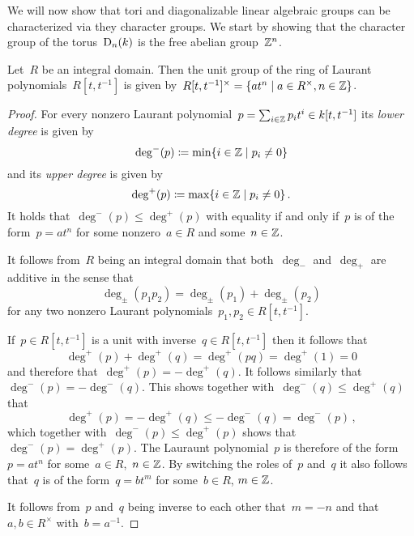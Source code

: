 \begin{fluff}
  We will now show that tori and diagonalizable linear algebraic groups can be characterized via they character groups.
  We start by showing that the character group of the torus~$\operatorname{D}_n(k)$ is the free abelian group~$\mathbb{Z}^n$.
\end{fluff}


\begin{lemma}
  \label{units of laurant polynomials}
  Let~$R$ be an integral domain.
  Then the unit group of the ring of Laurant polynomials~$R[t,t^{-1}]$ is given by~$R[t,t^{-1}]^\times = \{ a t^n \suchthat a \in R^\times, n \in \Integer\}$.
\end{lemma}


\begin{proof}
  For every nonzero Laurant polynomial~$p = \sum_{i \in \mathbb{Z}} p_i t^i \in k[t,t^{-1}]$ its \emph{lower degree} is given by
  \[
              \deg^-(p)
    \defined  \min \{ i \in \Integer \suchthat p_i \neq 0 \}
  \]
  and its \emph{upper degree} is given by
  \[
              \deg^+(p)
    \defined  \max \{ i \in \Integer \suchthat p_i \neq 0 \} \,.
  \]
  It holds that~$\deg^-(p) \leq \deg^+(p)$ with equality if and only if~$p$ is of the form~$p = a t^n$ for some nonzero~$a \in R$ and some~$n \in \mathbb{Z}$.
  
  It follows from~$R$ being an integral domain that both~$\deg_-$ and~$\deg_+$ are additive in the sense that
  \[
    \deg_\pm(p_1 p_2) = \deg_\pm(p_1) + \deg_\pm(p_2)
  \]
  for any two nonzero Laurant polynomials~$p_1, p_2 \in R[t, t^{-1}]$.
  
  If~$p \in R[t, t^{-1}]$ is a unit with inverse~$q \in R[t, t^{-1}]$ then it follows that
  \[
      \deg^+(p) + \deg^+(q)
    = \deg^+(pq)
    = \deg^+(1)
    = 0
  \]
  and therefore that~$\deg^+(p) = -\deg^+(q)$.
  It follows similarly that~$\deg^-(p) = -\deg^-(q)$.
  This shows together with~$\deg^-(q) \leq \deg^+(q)$ that
  \[
          \deg^+(p)
    =     - \deg^+(q)
    \leq  - \deg^-(q)
    =     \deg^-(p) \,,
  \]
  which together with~$\deg^-(p) \leq \deg^+(p)$ shows that~$\deg^-(p) = \deg^+(p)$.
  The Lauraunt polynomial~$p$ is therefore of the form~$p = a t^n$ for some~$a \in R$,~$n \in \mathbb{Z}$.
  By switching the roles of~$p$ and~$q$ it also follows that~$q$ is of the form~$q = b t^m$ for some~$b \in R$, $m \in \mathbb{Z}$.
  
  It follows from~$p$ and~$q$ being inverse to each other that~$m = -n$ and that~$a, b \in R^\times$ with~$b = a^{-1}$.
\end{proof}


